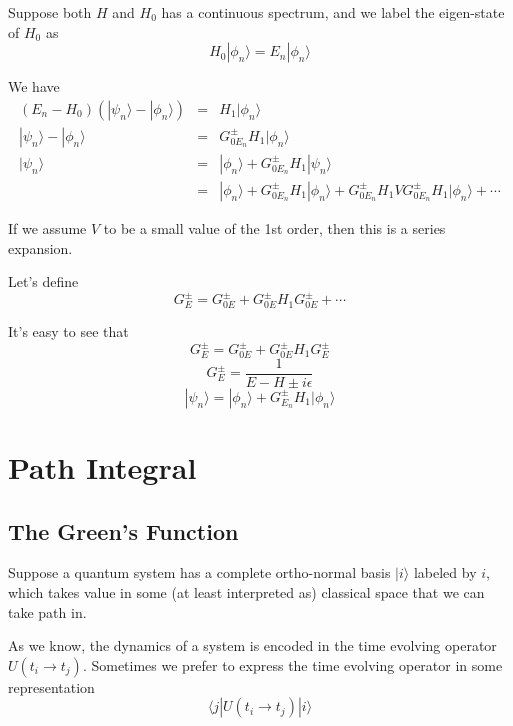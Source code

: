 \documentclass[12pt]{book}
\begin{document}
	Suppose both $H$ and $H_0$ has a continuous spectrum, and we label the eigen-state of $H_0$ as 
	\begin{equation}
		H_0|\phi_n\rangle=E_n|\phi_n\rangle
	\end{equation}
	
	We have
	\begin{eqnarray}
		(E_n-H_0)(|\psi_n\rangle-|\phi_n\rangle)&=&H_1|\phi_n\rangle\\
		|\psi_n\rangle-|\phi_n\rangle&=&G_{0E_n}^\pm H_1|\phi_n\rangle\\
		|\psi_n\rangle&=&|\phi_n\rangle+G_{0E_n}^\pm H_1|\psi_n\rangle\\
		&=&|\phi_n\rangle+G_{0E_n}^\pm H_1|\phi_n\rangle+G_{0E_n}^\pm H_1VG_{0E_n}^\pm H_1|\phi_n\rangle+\cdots
	\end{eqnarray}
	
	If we assume $V$ to be a small value of the 1st order, then this is a series expansion.
	
	Let's define
	\begin{equation}
		G_E^\pm=G_{0E}^\pm+G_{0E}^\pm H_1G_{0E}^\pm +\cdots
	\end{equation}
	
	It's easy to see that
	\begin{equation}
		G_E^\pm=G_{0E}^\pm+G_{0E}^\pm H_1G_E^\pm
	\end{equation}
	\begin{equation}
		G_E^\pm=\frac 1{E-H\pm i\epsilon}
	\end{equation}
	\begin{equation}
		|\psi_n\rangle=|\phi_n\rangle+G_{E_n}^\pm H_1|\phi_n\rangle
	\end{equation}


	
	\chapter {Path Integral}
	
	\section{The Green's Function}
	
	Suppose a quantum system has a complete ortho-normal basis $|i\rangle$ labeled by $i$, which takes value in some (at least interpreted as) classical space that we can take path in. 
	
	As we know, the dynamics of a system is encoded in the time evolving operator $U(t_i\rightarrow t_j)$. Sometimes we prefer to express the time evolving operator in some representation 
	\begin{equation}
		\langle j|U(t_i\rightarrow t_j)|i\rangle
	\end{equation}
	
\end{document}
